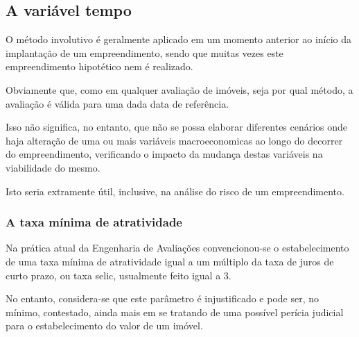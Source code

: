 \documentclass[
	12pt,				%
	oneside,			%
	a4paper,			%
	chapter=TITLE,		%
	section=TITLE,		%
	english,			%
	brazil				%
	]{abntex2}
\begin{document}
\hypertarget{a-variuxe1vel-tempo}{%
\subsection{A variável tempo}\label{a-variuxe1vel-tempo}}

O método involutivo é geralmente aplicado em um momento anterior ao início da
implantação de um empreendimento, sendo que muitas vezes este empreendimento
hipotético nem é realizado.

Obviamente que, como em qualquer avaliação de imóveis, seja por qual método, a
avaliação é válida para uma dada data de referência.

Isso não significa, no entanto, que não se possa elaborar diferentes cenários
onde haja alteração de uma ou mais variáveis macroeconomicas ao longo do
decorrer do empreendimento, verificando o impacto da mudança destas variáveis
na viabilidade do mesmo.

Isto seria extramente útil, inclusive, na análise do risco de um empreendimento.

\hypertarget{a-taxa-muxednima-de-atratividade}{%
\subsubsection{A taxa mínima de atratividade}\label{a-taxa-muxednima-de-atratividade}}

Na prática atual da Engenharia de Avaliações convencionou-se o estabelecimento
de uma taxa mínima de atratividade igual a um múltiplo da taxa de juros de curto
prazo, ou taxa selic, usualmente feito igual a 3.

No entanto, considera-se que este parâmetro é injustificado e pode ser, no
mínimo, contestado, ainda mais em se tratando de uma possível perícia judicial
para o estabelecimento do valor de um imóvel.
\end{document}
